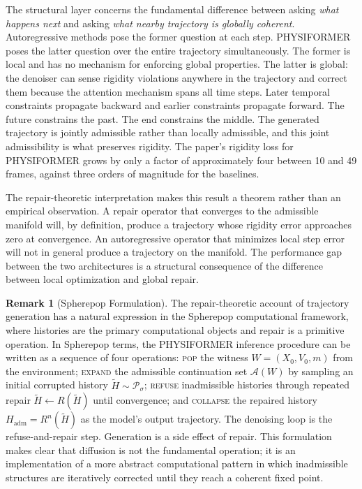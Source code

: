 \documentclass[12pt,oneside]{article}
\theoremstyle{definition}
\newtheorem{remark}[theorem]{Remark}
\newcommand{\A}{\mathcal{A}}
\begin{document}
The structural layer concerns the fundamental difference between asking \textit{what
happens next} and asking \textit{what nearby trajectory is globally coherent}.
Autoregressive methods pose the former question at each step. PHYSIFORMER poses the
latter question over the entire trajectory simultaneously. The former is local and
has no mechanism for enforcing global properties. The latter is global: the denoiser
can sense rigidity violations anywhere in the trajectory and correct them because the
attention mechanism spans all time steps. Later temporal constraints propagate backward
and earlier constraints propagate forward. The future constrains the past. The end
constrains the middle. The generated trajectory is jointly admissible rather than
locally admissible, and this joint admissibility is what preserves rigidity. The
paper's rigidity loss for PHYSIFORMER grows by only a factor of approximately four
between 10 and 49 frames, against three orders of magnitude for the baselines.

The repair-theoretic interpretation makes this result a theorem rather than an
empirical observation. A repair operator that converges to the admissible manifold
will, by definition, produce a trajectory whose rigidity error approaches zero at
convergence. An autoregressive operator that minimizes local step error will not in
general produce a trajectory on the manifold. The performance gap between the two
architectures is a structural consequence of the difference between local optimization
and global repair.

\begin{remark}[Spherepop Formulation]
The repair-theoretic account of trajectory generation has a natural expression in
the Spherepop computational framework, where histories are the primary computational
objects and repair is a primitive operation. In Spherepop terms, the PHYSIFORMER
inference procedure can be written as a sequence of four operations:
\textsc{pop} the witness \(W = (X_0, V_0, m)\) from the environment;
\textsc{expand} the admissible continuation set \(\A(W)\) by sampling an
initial corrupted history \(\tilde{H} \sim \mathcal{P}_\sigma\);
\textsc{refuse} inadmissible histories through repeated repair \(\tilde{H} \leftarrow R(\tilde{H})\)
until convergence; and
\textsc{collapse} the repaired history \(H_{\mathrm{adm}} = R^n(\tilde{H})\)
as the model's output trajectory.
The denoising loop is the refuse-and-repair step. Generation is a side effect of
repair. This formulation makes clear that diffusion is not the fundamental operation;
it is an implementation of a more abstract computational pattern in which inadmissible
structures are iteratively corrected until they reach a coherent fixed point.
\end{remark}
\end{document}
